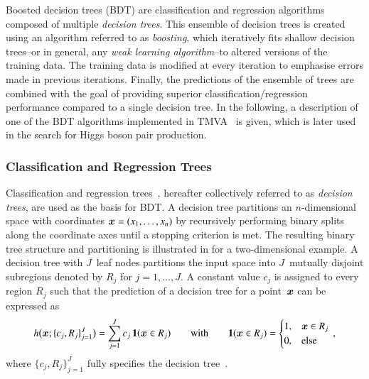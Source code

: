 Boosted decision trees (BDT) are classification and regression algorithms
composed of multiple \emph{decision trees}. This ensemble of decision trees is
created using an algorithm referred to as \emph{boosting}, which iteratively
fits shallow decision trees--or in general, any \emph{weak learning
  algorithm}--to altered versions of the training data. The training data is
modified at every iteration to emphasise errors made in previous
iterations. Finally, the predictions of the ensemble of trees are combined with
the goal of providing superior classification/regression performance compared to
a single decision tree. In the following, a description of one of the BDT
algorithms implemented in \textsc{TMVA}~\cite{TMVA} is given, which is later
used in the search for Higgs boson pair production.


\subsubsection{Classification and Regression Trees}

Classification and regression trees~\cite{Breiman:1984jka,hastie09}, hereafter
collectively referred to as \emph{decision trees}, are used as the basis for
BDT. A decision tree partitions an $n$-dimensional space with coordinates
$\bm{x} = (x_1, \dots, x_n)$ by recursively performing binary splits along
the coordinate axes until a stopping criterion is met. The resulting binary tree
structure and partitioning is illustrated in  for a
two-dimensional example. A decision tree with $J$~leaf nodes partitions the
input space into $J$~mutually disjoint subregions denoted by $R_j$ for
$j = 1, \dots, J$. A constant value $c_j$ is assigned to every region $R_j$ such
that the prediction of a decision tree for a point~$\bm{x}$ can be expressed
as
\begin{align*}
  h\bigl( \bm{x}; \{c_j, R_j\}_{j=1}^{J} \bigr) = \sum_{j = 1}^{J} c_j \, \mathbf{1}(\bm{x} \in R_j) \qquad \text{with} \qquad \mathbf{1}(\bm{x} \in R_j) =
  \begin{cases}
    1, & \bm{x} \in R_j \\
    0, & \text{else}
  \end{cases} \,\text{,}
\end{align*}
where $\{c_j, R_j\}_{j=1}^{J}$ fully specifies the decision
tree~\cite{hastie09}.

